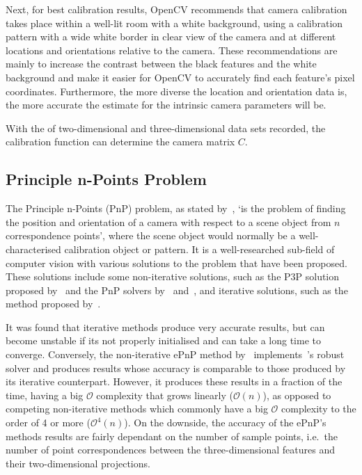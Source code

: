 Next, for best calibration results, OpenCV recommends that camera calibration takes place within a well-lit room with a white background, using a calibration pattern with a wide white border in clear view of the camera and at different locations and orientations relative to the camera. These recommendations are mainly to increase the contrast between the black features and the white background and make it easier for OpenCV to accurately find each feature's pixel coordinates. Furthermore, the more diverse the location and orientation data is, the more accurate the estimate for the intrinsic camera parameters will be. 

With the of two-dimensional and three-dimensional data sets recorded, the calibration function can determine the camera matrix $C$. 

\subsection{Principle n-Points Problem}

The Principle n-Points (PnP) problem, as stated by~\cite{horaud1989analytic}, `is the problem of finding the position and orientation of a camera with respect to a scene object from $n$ correspondence points', where the scene object would normally be a well-characterised calibration object or pattern. It is a well-researched sub-field of computer vision with various solutions to the problem that have been proposed. These solutions include some non-iterative solutions, such as the P3P solution proposed by~\cite{gao2003complete} and the PnP solvers by~\cite{lepetit2009epnp} and~\cite{schweighofer2006robust}, and iterative solutions, such as the method proposed by~\cite{lu2000fast}.

It was found that iterative methods produce very accurate results, but can become unstable if its not properly initialised and can take a long time to converge. Conversely, the non-iterative ePnP method by~\citeauthor{lepetit2009epnp} implements~\citeauthor{schweighofer2006robust}'s robust solver and produces results whose accuracy is comparable to those produced by its iterative counterpart. However, it produces these results in a fraction of the time, having a big $\mathcal{O}$ complexity that grows linearly ($\mathcal{O}(n)$), as opposed to competing non-iterative methods which commonly have a big $\mathcal{O}$ complexity to the order of 4 or more ($\mathcal{O}^4(n)$). On the downside, the accuracy of the ePnP's methods results are fairly dependant on the number of sample points, i.e.\ the number of point correspondences between the three-dimensional features and their two-dimensional projections. 

